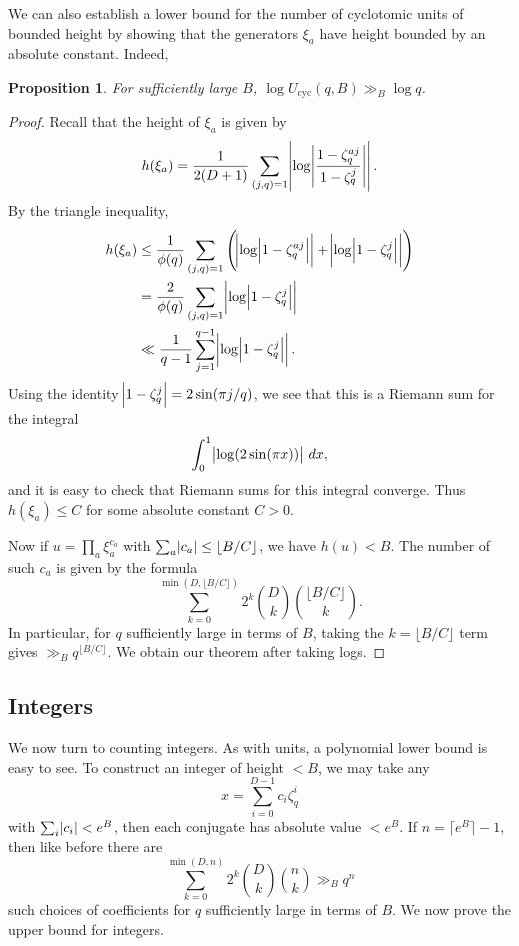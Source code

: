 \documentclass[10pt,a4paper]{amsart}
\newtheorem{prop}{Proposition}
\DeclareMathOperator{\cyc}{cyc}
\begin{document}
We can also establish a lower bound for the number of cyclotomic units of bounded height by showing that the generators $\xi_a$ have height bounded by an absolute constant. Indeed,

\begin{prop}
    For sufficiently large $B$, $\log U_{\cyc}(q,B) \gg_B \log q$.
\end{prop}
\begin{proof}
    Recall that the height of $\xi_a$ is given by
\[
h(\xi_a) = \frac{1}{2(D+1)} \sum_{(j,q)=1} \abs{\log \abs{\frac{1-\zeta_q^{aj}}{1-\zeta_q^j}}}.
\]
By the triangle inequality,
\begin{align*}
h(\xi_a) &\leq \frac{1}{\phi(q)} \sum_{(j,q)=1} \left( \abs{\log \abs{1-\zeta_q^{aj}}} + \abs{\log \abs{1-\zeta_q^j}} \right) \\
&= \frac{2}{\phi(q)} \sum_{(j,q)=1} \abs{\log \abs{1-\zeta_q^j}} \\
&\ll \frac{1}{q-1}
\sum_{j=1}^{q-1} \abs{\log \abs{1-\zeta_q^j}}.
\end{align*}
Using the identity $\abs{1-\zeta_q^j} = 2\sin(\pi j/q)$, we see that this is a Riemann sum for the integral
\[
\int_0^1 \abs{\log(2\sin(\pi x))} \, dx,
\]
and it is easy to check that Riemann sums for this integral converge. Thus $h(\xi_a) \leq C$ for some absolute constant $C > 0$.

Now if $u = \prod_a \xi_a^{c_a}$ with $\sum_a \abs{c_a} \leq \lfloor B/C \rfloor$, we have $h(u) < B$. The number of such $c_a$ is given by the formula
\[
\sum_{k=0}^{\min(D,\lfloor B/C \rfloor)} 2^k \binom{D}{k} \binom{\lfloor B/C \rfloor}{k}.
\]
In particular, for $q$ sufficiently large in terms of $B$, taking the $k=\lfloor B/C \rfloor$ term gives $\gg_B q^{\lfloor B/C \rfloor}$. We obtain our theorem after taking logs.

\end{proof}

\subsection{Integers}
We now turn to counting integers. As with units, a polynomial lower bound is easy to see. To construct an integer of height $< B$, we may take any
\[
x = \sum_{i=0}^{D-1} c_i \zeta_q^i
\]
with $\sum_i \abs{c_i} < e^B$, then each conjugate has absolute value $< e^B$. If $n=\lceil e^B\rceil-1$, then like before there are
\[
\sum_{k=0}^{\min(D,n)} 2^k \binom{D}{k}\binom{n}{k} \gg_B q^n
\]
such choices of coefficients for $q$ sufficiently large in terms of $B$. We now prove the upper bound for integers.
\end{document}
